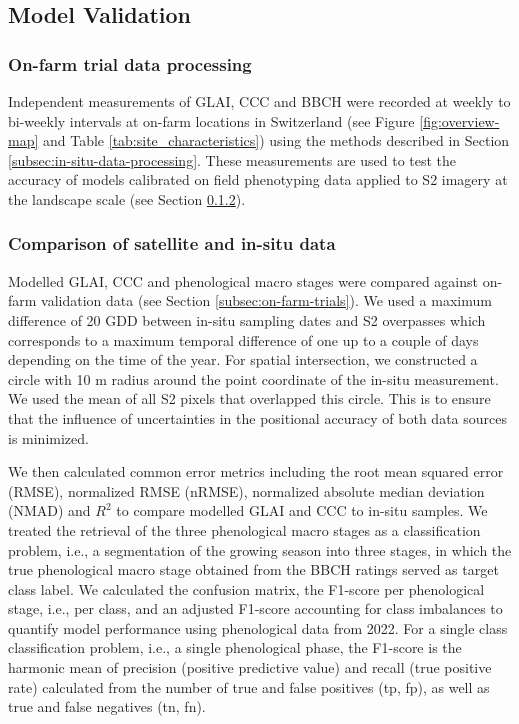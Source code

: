 \subsection{Model Validation}
\label{subsec:model-validation}

\subsubsection{On-farm trial data processing}
Independent measurements of GLAI, \gls{CCC} and BBCH were recorded at weekly to bi-weekly intervals at on-farm locations in Switzerland (see Figure \ref{fig:overview-map} and Table \ref{tab:site_characteristics}) using the methods described in Section \ref{subsec:in-situ-data-processing}. These measurements are used to test the accuracy of models calibrated on field phenotyping data applied to \gls{S2} imagery at the landscape scale (see Section \ref{subsubsec:comparison-sat-insitu}).

\subsubsection{Comparison of satellite and in-situ data}
\label{subsubsec:comparison-sat-insitu}
Modelled GLAI, \gls{CCC} and phenological macro stages were compared against on-farm validation data (see Section \ref{subsec:on-farm-trials}). We used a maximum difference of 20 GDD between in-situ sampling dates and \gls{S2} overpasses which corresponds to a maximum temporal difference of one up to a couple of days depending on the time of the year. For spatial intersection, we constructed a circle with 10 m radius around the point coordinate of the in-situ measurement. We used the mean of all \gls{S2} pixels that overlapped this circle. This is to ensure that the influence of uncertainties in the positional accuracy of both data sources is minimized.

We then calculated common error metrics including the root mean squared error (RMSE), normalized RMSE (nRMSE), normalized absolute median deviation (NMAD) and $R^2$ to compare modelled \gls{GLAI} and \gls{CCC} to in-situ samples. We treated the retrieval of the three phenological macro stages as a classification problem, i.e., a segmentation of the growing season into three stages, in which the true phenological macro stage obtained from the BBCH ratings served as target class label. We calculated the confusion matrix, the F1-score per phenological stage, i.e., per class, and an adjusted F1-score accounting for class imbalances to quantify model performance using phenological data from 2022.
For a single class classification problem, i.e., a single phenological phase, the F1-score is the harmonic mean of precision (positive predictive value) and recall (true positive rate) calculated from the number of true and false positives (tp, fp), as well as true and false negatives (tn, fn).

